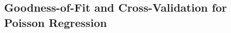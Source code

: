 \documentclass[10pt]{article}
\begin{document}





\subsection{Goodness-of-Fit and Cross-Validation for Poisson Regression}
\end{document}
